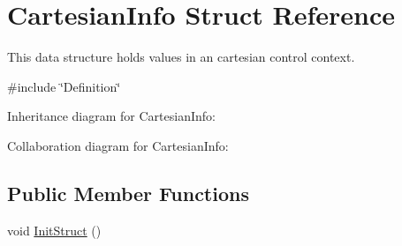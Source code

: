 \hypertarget{struct_cartesian_info}{}\section{Cartesian\+Info Struct Reference}
\label{struct_cartesian_info}


This data structure holds values in an cartesian control context.  




{\ttfamily \#include \char`\"{}Definition\char`\"{}}



Inheritance diagram for Cartesian\+Info\+:


Collaboration diagram for Cartesian\+Info\+:
\subsection*{Public Member Functions}
\begin{DoxyCompactItemize}
\item 
void \hyperlink{struct_cartesian_info_a6d47623939d86124525ab4c8f7a2b8e9}{Init\+Struct} ()
\end{DoxyCompactItemize}
